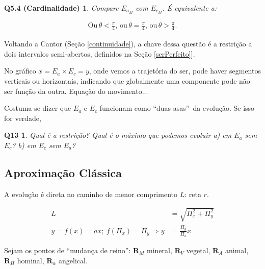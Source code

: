 \documentclass[12pt,a4paper]{article}
\begin{document}
			\newtheorem{Q5.4}{Q5.4 (Cardinalidade)}
			\begin{Q5.4} Compare $ E_{a_M} $ com $ E_{c_M} $. \'E equivalente a:
			\end{Q5.4}

			\begin{align*}
				\mathrm{Ou}\,\theta < \frac{\pi}{4}, \,\mathrm{ou}\, \theta = \frac{\pi}{4}, \,\mathrm{ou}\, \theta > \frac{\pi}{4}.
			\end{align*}

			Voltando a Cantor (Se\c{c}\~ao \ref{continuidade}), a chave dessa quest\~ao \'e a restri\c{c}\~ao a dois intervalos semi-abertos, definidos na Se\c{c}\~ao \ref{serPerfeito}].

			No gr\'afico $ x = E_a \times E_c = y $, onde vemos a trajet\'oria do ser, pode haver segmentos verticais ou horizontais, indicando que globalmente uma componente pode n\~ao ser fun\c{c}\~ao da outra. Equa\c{c}\~ao do movimento...

			Costuma-se dizer que $E_a$ e $E_c$ funcionam como \textquotedblleft duas asas\textquotedblright\, da evolu\c{c}\~ao. Se isso for verdade,

			\newtheorem{Q13}{Q13}
			\begin{Q13} Qual \'e a restri\c{c}\~ao? Qual \'e o m\'aximo que podemos evoluir a) em $E_a$ sem $E_c$? b) em $E_c$ sem $E_a$?
			\end{Q13}

		\subsection{Aproxima\c{c}\~ao Cl\'assica}
			\begin{flushright}
			\end{flushright}

			A evolu\c{c}\~ao \'e direta no caminho de menor comprimento $L$: reta $r$.

			\begin{align*}
				L &= \sqrt{\Pi_x^2 + \Pi_y^2} \\
				y = f(x) = ax; \ f\left(\Pi_x\right) = \Pi_y \Rightarrow y &=\frac{\Pi_y}{\Pi_x} x
			\end{align*}

			Sejam os pontos de \textquotedblleft mudan\c{c}a de reino\textquotedblright: $ \mathbf{R}_M $ mineral, $ \mathbf{R}_V $ vegetal, $ \mathbf{R}_A $ animal, $ \mathbf{R}_H $ hominal, $ \mathbf{R}_\alpha $ angelical.

			\begin{center}
			\end{center}
\end{document}
